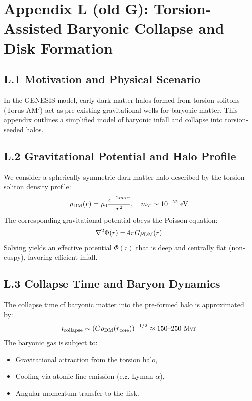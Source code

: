 \documentclass{article}
\begin{document}
\section*{Appendix L (old G): Torsion-Assisted Baryonic Collapse and Disk Formation}
\label{app:torsion-collapse}


\label{app:torsion-collapse}


\subsection*{L.1 Motivation and Physical Scenario}
In the GENESIS model, early dark-matter halos formed from torsion solitons (Torus AM$'$) act as pre-existing gravitational wells for baryonic matter. This appendix outlines a simplified model of baryonic infall and collapse into torsion-seeded halos.

\subsection*{L.2 Gravitational Potential and Halo Profile}
We consider a spherically symmetric dark-matter halo described by the torsion-soliton density profile:
\begin{equation}
\rho_{\rm DM}(r) = \rho_0 \frac{e^{-2m_T r}}{r^2}, \quad m_T \sim 10^{-22}~\text{eV}
\end{equation}
The corresponding gravitational potential obeys the Poisson equation:
\begin{equation}
\nabla^2 \Phi(r) = 4\pi G \rho_{\rm DM}(r)
\end{equation}
Solving yields an effective potential $\Phi(r)$ that is deep and centrally flat (non-cuspy), favoring efficient infall.

\subsection*{L.3 Collapse Time and Baryon Dynamics}
The collapse time of baryonic matter into the pre-formed halo is approximated by:
\begin{equation}
t_{\rm collapse} \sim \left(G \rho_{\rm DM}(r_{\rm core})\right)^{-1/2} \approx 150\text{--}250~\text{Myr}
\end{equation}
The baryonic gas is subject to:
\begin{itemize}
  \item Gravitational attraction from the torsion halo,
  \item Cooling via atomic line emission (e.g. Lyman-$\alpha$),
  \item Angular momentum transfer to the disk.
\end{itemize}
\end{document}
